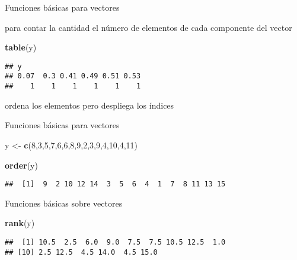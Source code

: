 \documentclass[ignorenonframetext,]{beamer}
\newenvironment{Shaded}{\begin{snugshade}}{\end{snugshade}}
\newcommand{\KeywordTok}[1]{\textcolor[rgb]{0.13,0.29,0.53}{\textbf{#1}}}
\newcommand{\DecValTok}[1]{\textcolor[rgb]{0.00,0.00,0.81}{#1}}
\newcommand{\StringTok}[1]{\textcolor[rgb]{0.31,0.60,0.02}{#1}}
\newcommand{\NormalTok}[1]{#1}
\begin{document}
\begin{frame}[fragile]{Funciones básicas para vectores}

para contar la cantidad el número de elementos de cada componente del
vector

\begin{Shaded}
\begin{Highlighting}[]
\KeywordTok{table}\NormalTok{(y)}
\end{Highlighting}
\end{Shaded}

\begin{verbatim}
## y
## 0.07  0.3 0.41 0.49 0.51 0.53 
##    1    1    1    1    1    1
\end{verbatim}

ordena los elementos pero despliega los índices

\end{frame}

\begin{frame}[fragile]{Funciones básicas para vectores}

\begin{Shaded}
\begin{Highlighting}[]
\NormalTok{y <-}\StringTok{ }\KeywordTok{c}\NormalTok{(}\DecValTok{8}\NormalTok{,}\DecValTok{3}\NormalTok{,}\DecValTok{5}\NormalTok{,}\DecValTok{7}\NormalTok{,}\DecValTok{6}\NormalTok{,}\DecValTok{6}\NormalTok{,}\DecValTok{8}\NormalTok{,}\DecValTok{9}\NormalTok{,}\DecValTok{2}\NormalTok{,}\DecValTok{3}\NormalTok{,}\DecValTok{9}\NormalTok{,}\DecValTok{4}\NormalTok{,}\DecValTok{10}\NormalTok{,}\DecValTok{4}\NormalTok{,}\DecValTok{11}\NormalTok{)}
\end{Highlighting}
\end{Shaded}

\begin{Shaded}
\begin{Highlighting}[]
\KeywordTok{order}\NormalTok{(y)}
\end{Highlighting}
\end{Shaded}

\begin{verbatim}
##  [1]  9  2 10 12 14  3  5  6  4  1  7  8 11 13 15
\end{verbatim}

\end{frame}

\begin{frame}[fragile]{Funciones básicas sobre vectores}

\begin{Shaded}
\begin{Highlighting}[]
\KeywordTok{rank}\NormalTok{(y)}
\end{Highlighting}
\end{Shaded}

\begin{verbatim}
##  [1] 10.5  2.5  6.0  9.0  7.5  7.5 10.5 12.5  1.0
## [10] 2.5 12.5  4.5 14.0  4.5 15.0
\end{verbatim}

\end{frame}
\end{document}

